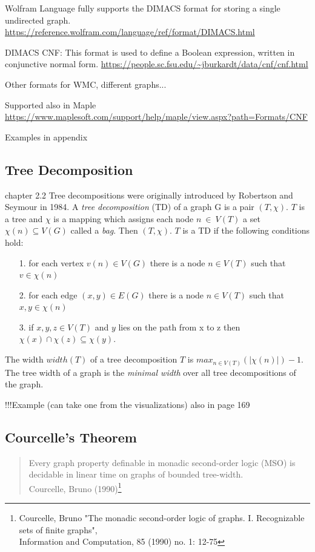 \documentclass[a4paper, 12pt]{scrartcl}
\begin{document}
Wolfram Language fully supports the DIMACS format for storing a single undirected graph.
\url{https://reference.wolfram.com/language/ref/format/DIMACS.html}

DIMACS CNF: This format is used to define a Boolean expression, written in conjunctive normal form.
\url{https://people.sc.fsu.edu/~jburkardt/data/cnf/cnf.html}

Other formats for WMC, different graphs...

Supported also in Maple \url{https://www.maplesoft.com/support/help/maple/view.aspx?path=Formats/CNF}

Examples in appendix

\subsection{Tree Decomposition}
\cite{DiplomarbeitZisser}chapter 2.2
Tree decompositions were originally introduced by Robertson and Seymour \cite{ROBERTSON198449} in 1984.
A \textit{tree decomposition} (TD) of a graph G is a pair $(T, \chi)$. $T$ is a tree and $\chi$ is a mapping which assigns each node $n~\in~V(T)$ 
a set $\chi(n) \subseteq V(G)$ called a \textit{bag}. Then $(T, \chi)$. $T$ is a TD if the following conditions hold:

\begin{itemize}
	\item[1.] for each vertex $v(n) \in V(G)$ there is a node $n \in V(T)$ such that $v \in \chi(n)$
	\item[2.] for each edge $(x,y) \in E(G)$ there is a node $n\in V(T)$ such that $x,y \in\chi(n)$
	\item[3.] if $x,y,z \in V(T)$ and $y$ lies on the path from x to z then $\chi(x) \cap \chi(z) \subseteq \chi(y)$.
\end{itemize}
The width $width(T)$ of a tree decomposition $T$ is $max_{n\in V(T)}(|\chi(n)|)-1$.
The tree width of a graph is the \textit{minimal width} over all tree decompositions of the graph.

!!!Example (can take one from the visualizations) also in \cite{pcgp2019} page 169
\subsection{Courcelle's Theorem}
\begin{quotation}
	Every graph property definable in monadic second-order logic (MSO) is decidable in linear time on graphs of bounded tree-width.\\
	{\small Courcelle, Bruno (1990)}\footnote{Courcelle, Bruno "The monadic second-order logic of graphs. I. Recognizable sets of finite graphs",\\ Information and Computation, 85 (1990) no. 1: 12-75}
\end{quotation}
\end{document}
